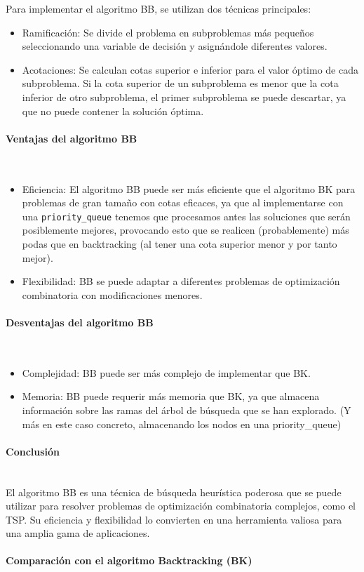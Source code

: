 \documentclass{article}
\newcommand{\myparagraph}[1]{\paragraph{#1}\mbox{}\\}
\begin{document}
Para implementar el algoritmo BB, se utilizan dos técnicas principales:
\begin{itemize}
    \item Ramificación: Se divide el problema en subproblemas más pequeños seleccionando una variable de decisión y asignándole diferentes valores.
    \item Acotaciones: Se calculan cotas superior e inferior para el valor óptimo de cada subproblema. Si la cota superior de un subproblema es menor que la cota inferior de otro subproblema, el primer subproblema se puede descartar, ya que no puede contener la solución óptima.
\end{itemize}

\myparagraph{Ventajas del algoritmo BB}
\begin{itemize}
    \item Eficiencia: El algoritmo BB puede ser más eficiente que el algoritmo BK para problemas de gran tamaño con cotas eficaces, ya que al implementarse con una \verb|priority_queue| tenemos que procesamos antes las soluciones que serán posiblemente mejores, provocando esto que se realicen (probablemente) más podas que en backtracking (al tener una cota superior menor y por tanto mejor).
    \item Flexibilidad: BB se puede adaptar a diferentes problemas de optimización combinatoria con modificaciones menores.
\end{itemize}
\myparagraph{Desventajas del algoritmo BB}
\begin{itemize}
    \item Complejidad: BB puede ser más complejo de implementar que BK.
    \item Memoria: BB puede requerir más memoria que BK, ya que almacena información sobre las ramas del árbol de búsqueda que se han explorado. (Y más en este caso concreto, almacenando los nodos en una priority\_queue)
\end{itemize}
\myparagraph{Conclusión}

El algoritmo BB es una técnica de búsqueda heurística poderosa que se puede utilizar para resolver problemas de optimización combinatoria complejos, como el TSP. Su eficiencia y flexibilidad lo convierten en una herramienta valiosa para una amplia gama de aplicaciones.

\myparagraph{Comparación con el algoritmo Backtracking (BK)}
\end{document}
